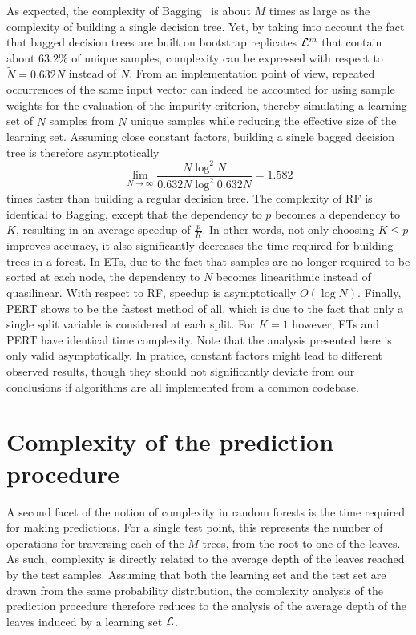 As expected, the complexity of Bagging~\citep{breiman:1996b} is about $M$ times
as large as the complexity of building a single decision tree. Yet, by taking
into account the fact that bagged decision trees are built on bootstrap
replicates ${\cal L}^m$ that contain about $63.2\%$ of unique samples,
complexity can be expressed with respect to $\widetilde{N} = 0.632 N$ instead
of $N$. From an implementation point of view, repeated occurrences of the same
input vector can indeed be accounted for using sample weights for the
evaluation of the impurity criterion, thereby  simulating a learning set of $N$
samples from $\widetilde{N}$ unique samples while reducing the effective size
of the learning set. Assuming close constant factors, building a single bagged
decision tree is therefore asymptotically
\begin{equation}
\lim_{N\to \infty} \frac{N\log^2 N}{0.632N \log^2 0.632N} = 1.582
\end{equation}
times faster than building a regular decision tree. The complexity of RF is
identical to Bagging, except that the dependency
to $p$ becomes a dependency to $K$, resulting in an average speedup of
$\tfrac{p}{K}$. In other words, not only choosing $K \leq p$ improves accuracy,
it also significantly decreases the time required for building trees in a
forest. In ETs, due to the fact that
samples are no longer required to be sorted at each node, the dependency to $N$
becomes linearithmic instead of quasilinear. With respect to RF,
speedup is asymptotically $O(\log N)$. Finally, PERT shows to be the fastest
method of all, which is due to the fact that only a single split variable
is considered at each split. For $K=1$ however, ETs and PERT have identical
time complexity. Note that the analysis presented here is only valid
asymptotically. In pratice, constant factors might lead to different
observed results, though they should not significantly deviate  from our conclusions if
algorithms are all implemented from a common codebase.

\section{Complexity of the prediction procedure}
\label{sec:5:complexity-predict}

A second facet of the notion of complexity in random forests is the time
required for making predictions. For a single test point, this represents the
number of operations for traversing each of the $M$ trees, from the root to one
of the leaves. As such, complexity is directly related to the average depth of
the leaves reached by the test samples. Assuming that both the learning set and
the test set are drawn from the same probability distribution, the complexity
analysis of the prediction procedure therefore reduces to the analysis of the
average depth of the leaves induced by a learning set ${\cal L}$.

